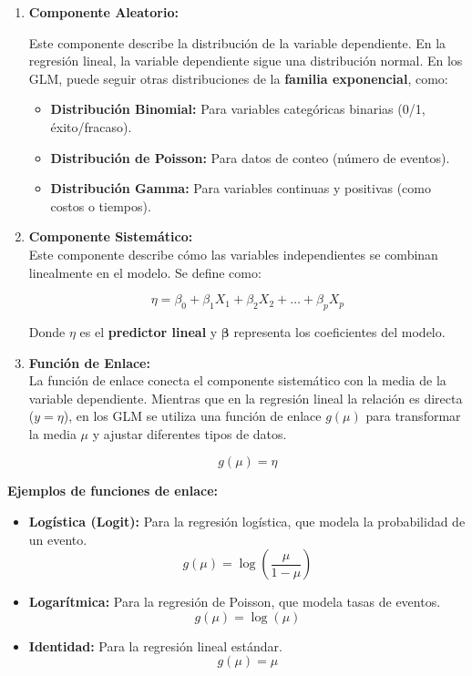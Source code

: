 \documentclass[
  letterpaper,
  DIV=11,
  numbers=noendperiod]{scrreprt}
\providecommand{\tightlist}{%
  \setlength{\itemsep}{0pt}\setlength{\parskip}{0pt}}
\begin{document}
\begin{enumerate}
\def\labelenumi{\arabic{enumi}.}
\item
  \textbf{Componente Aleatorio:}

  Este componente describe la distribución de la variable dependiente.
  En la regresión lineal, la variable dependiente sigue una distribución
  normal. En los GLM, puede seguir otras distribuciones de la
  \textbf{familia exponencial}, como:

  \begin{itemize}
  \tightlist
  \item
    \textbf{Distribución Binomial:} Para variables categóricas binarias
    (0/1, éxito/fracaso).
  \item
    \textbf{Distribución de Poisson:} Para datos de conteo (número de
    eventos).
  \item
    \textbf{Distribución Gamma:} Para variables continuas y positivas
    (como costos o tiempos).
  \end{itemize}
\item
  \textbf{Componente Sistemático:}\\
  Este componente describe cómo las variables independientes se combinan
  linealmente en el modelo. Se define como:

  \[
  \eta = \beta_0 + \beta_1 X_1 + \beta_2 X_2 + \dots + \beta_p X_p
  \]

  Donde \(\eta\) es el \textbf{predictor lineal} y
  \(\boldsymbol{\beta}\) representa los coeficientes del modelo.
\item
  \textbf{Función de Enlace:}\\
  La función de enlace conecta el componente sistemático con la media de
  la variable dependiente. Mientras que en la regresión lineal la
  relación es directa (\(y = \eta\)), en los GLM se utiliza una función
  de enlace \(g(\mu)\) para transformar la media \(\mu\) y ajustar
  diferentes tipos de datos.

  \[
  g(\mu) = \eta
  \]
\end{enumerate}

\textbf{Ejemplos de funciones de enlace:}

\begin{itemize}
\tightlist
\item
  \textbf{Logística (Logit):} Para la regresión logística, que modela la
  probabilidad de un evento. \[
  g(\mu) = \log\left(\frac{\mu}{1 - \mu}\right)
  \]
\item
  \textbf{Logarítmica:} Para la regresión de Poisson, que modela tasas
  de eventos. \[
  g(\mu) = \log(\mu)
  \]
\item
  \textbf{Identidad:} Para la regresión lineal estándar. \[
  g(\mu) = \mu
  \]
\end{itemize}
\end{document}
